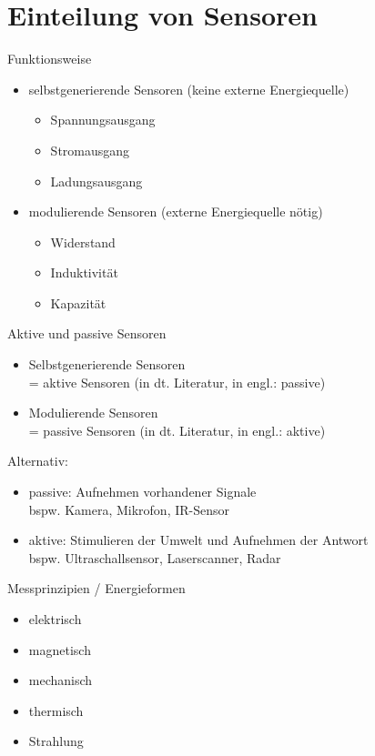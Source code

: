\documentclass{scrreprt}
\begin{document}
\section{Einteilung von Sensoren}
\begin{anumerate}
\item Funktionsweise
\begin{itemize}
\item selbstgenerierende Sensoren (keine externe Energiequelle)
\begin{itemize}
\item Spannungsausgang
\item Stromausgang
\item Ladungsausgang
\end{itemize}
\item modulierende Sensoren (externe Energiequelle nötig)
\begin{itemize}
\item Widerstand
\item Induktivität
\item Kapazität
\end{itemize}
\end{itemize}
\item Aktive und passive Sensoren
\begin{itemize}
\item Selbstgenerierende Sensoren\\
= aktive Sensoren (in dt. Literatur, in engl.: passive)
\item Modulierende Sensoren\\
= passive Sensoren (in dt. Literatur, in engl.: aktive)
\end{itemize}
Alternativ:
\begin{itemize}
\item passive: Aufnehmen vorhandener Signale\\
bspw. Kamera, Mikrofon, IR-Sensor
\item aktive: Stimulieren der Umwelt und Aufnehmen der Antwort\\
bspw. Ultraschallsensor, Laserscanner, Radar
\end{itemize}
\item Messprinzipien / Energieformen
\begin{itemize}
\item elektrisch
\item magnetisch
\item mechanisch
\item thermisch
\item Strahlung

\end{itemize}
\end{anumerate}
\end{document}
